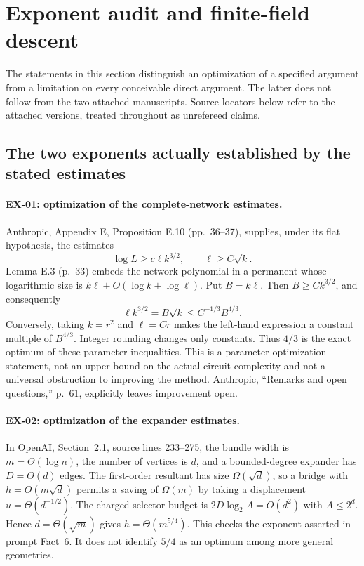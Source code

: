 \section{Exponent audit and finite-field descent}
\label{sec:exponent-audit}

The statements in this section distinguish an optimization of a specified
argument from a limitation on every conceivable direct argument.  The latter
does not follow from the two attached manuscripts.  Source locators below refer
to the attached versions, treated throughout as unrefereed claims.

\subsection{The two exponents actually established by the stated estimates}
\label{sec:ex-stated}

\paragraph{EX-01: optimization of the complete-network estimates.}
Anthropic, Appendix E, Proposition E.10 (pp.~36--37), supplies, under its flat
hypothesis, the estimates
\[
 \log L\geq c\ell k^{3/2},\qquad \ell\geq C\sqrt{k}.
\]
Lemma E.3 (p.~33) embeds the network polynomial in a permanent whose logarithmic
size is $k\ell+O(\log k+\log\ell)$.  Put $B=k\ell$.  Then
$B\geq Ck^{3/2}$, and consequently
\[
 \ell k^{3/2}=B\sqrt{k}\leq C^{-1/3}B^{4/3}.
\]
Conversely, taking $k=r^2$ and $\ell=Cr$ makes the left-hand expression a
constant multiple of $B^{4/3}$.  Integer rounding changes only constants.
Thus $4/3$ is the exact optimum of these parameter inequalities.  This is a
parameter-optimization statement, not an upper bound on the actual circuit
complexity and not a universal obstruction to improving the method.  Anthropic,
``Remarks and open questions,'' p.~61, explicitly leaves improvement open.

\paragraph{EX-02: optimization of the expander estimates.}
In OpenAI, Section~2.1, source lines 233--275, the bundle width is
$m=\Theta(\log n)$, the number of vertices is $d$, and a bounded-degree expander
has $D=\Theta(d)$ edges.  The first-order resultant has size
$\Omega(\sqrt d)$, so a bridge with $h=O(m\sqrt d)$ permits a saving of
$\Omega(m)$ by taking a displacement $u=\Theta(d^{-1/2})$.  The charged selector
budget is $2D\log_2 A=O(d^2)$ with $A\leq2^d$.  Hence $d=\Theta(\sqrt m)$
gives $h=\Theta(m^{5/4})$.  This checks the exponent asserted in prompt Fact~6.
It does not identify $5/4$ as an optimum among more general geometries.

